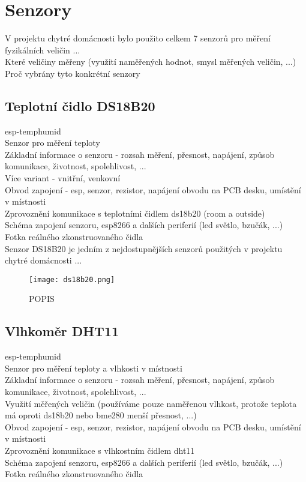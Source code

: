 \section{Senzory} \label{sec:example_xor}

V projektu chytré domácnosti bylo použito celkem 7 senzorů pro měření fyzikálních veličin ... \\
Které veličiny měřeny (využití naměřených hodnot, smysl měřených veličin, ...) \\
Proč vybrány tyto konkrétní senzory \\

\subsection{Teplotní čidlo DS18B20}

esp-temphumid \\
Senzor pro měření teploty \\
Základní informace o senzoru - rozsah měření, přesnost, napájení, způsob komunikace, životnost, spolehlivost, ... \\
Více variant - vnitřní, venkovní \\
Obvod zapojení - esp, senzor, rezistor, napájení obvodu na PCB desku, umístění v místnosti \\
Zprovoznění komunikace s teplotními čidlem ds18b20 (room a outside) \\
Schéma zapojení senzoru, esp8266 a dalších periferií (led světlo, bzučák, ...) \\
Fotka reálného zkonstruovaného čidla \\

Senzor DS18B20 je jedním z nejdostupnějších senzorů použitých v projektu chytré domácnosti ...

\begin{figure}[H]
  \centering
  \texttt{[image: ds18b20.png]}
  \caption{POPIS}
  \label{fig:hardware_components:LABEL}
\end{figure}

\subsection{Vlhkoměr DHT11}

esp-temphumid \\
Senzor pro měření teploty a  vlhkosti v místnosti \\
Základní informace o senzoru - rozsah měření, přesnost, napájení, způsob komunikace, životnost, spolehlivost, ... \\
Využití měřených veličin (používáme pouze naměřenou vlhkost, protože teplota má oproti ds18b20 nebo bme280 menší přesnost, ...) \\
Obvod zapojení - esp, senzor, rezistor, napájení obvodu na PCB desku, umístění v místnosti \\
Zprovoznění komunikace s vlhkostním čidlem dht11\\
Schéma zapojení senzoru, esp8266 a dalších periferií (led světlo, bzučák, ...) \\
Fotka reálného zkonstruovaného čidla \\

